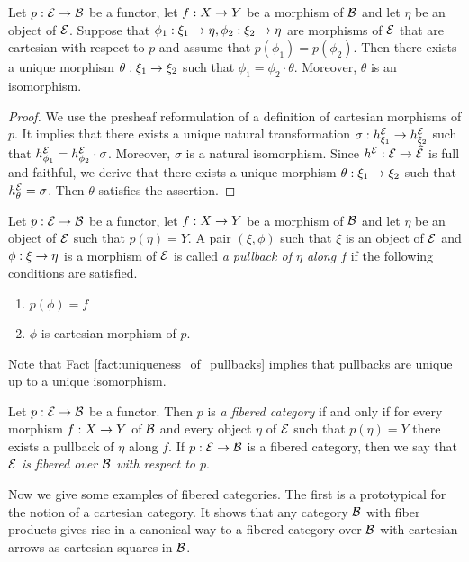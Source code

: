 \begin{fact}\label{fact:uniqueness_of_pullbacks}
Let $p:{\mathcal E}\rightarrow {\mathcal B}$ be a functor, let $f:X\rightarrow Y$ be a morphism of ${\mathcal B}$ and let $\eta$ be an object of ${\mathcal E}$. Suppose that $\phi_1:\xi_1\rightarrow \eta,\phi_2:\xi_2\rightarrow \eta$ are morphisms of ${\mathcal E}$ that are cartesian with respect to $p$ and assume that $p(\phi_1) = p(\phi_2)$. Then there exists a unique morphism $\theta:\xi_1\rightarrow \xi_2$ such that $\phi_1 = \phi_2\cdot \theta$. Moreover, $\theta$ is an isomorphism.
\end{fact}
\begin{proof}
We use the presheaf reformulation of a definition of cartesian morphisms of $p$. It implies that there exists a unique natural transformation $\sigma:h^{{\mathcal E}}_{\xi_1}\rightarrow h^{{\mathcal E}}_{\xi_2}$ such that $h^{{\mathcal E}}_{\phi_1} = h^{{\mathcal E}}_{\phi_2}\cdot \sigma$. Moreover, $\sigma$ is a natural isomorphism. Since $h^{{\mathcal E}}:{\mathcal E}\rightarrow \widehat{{\mathcal E}}$ is full and faithful, we derive that there exists a unique morphism $\theta:\xi_1 \rightarrow \xi_2$ such that $h^{{\mathcal E}}_{\theta} = \sigma$. Then $\theta$ satisfies the assertion.
\end{proof}

\begin{definition}
Let $p:{\mathcal E}\rightarrow {\mathcal B}$ be a functor, let $f:X\rightarrow Y$ be a morphism of ${\mathcal B}$ and let $\eta$ be an object of ${\mathcal E}$ such that $p(\eta) = Y$. A pair $(\xi,\phi)$ such that $\xi$ is an object of ${\mathcal E}$ and $\phi:\xi\rightarrow \eta$ is a morphism of ${\mathcal E}$ is called \textit{a pullback of $\eta$ along $f$} if the following conditions are satisfied.
\begin{enumerate}[label=\textbf{(\arabic*)}, leftmargin=3.0em]
\item $p(\phi) = f$
\item $\phi$ is cartesian morphism of $p$.
\end{enumerate}
\end{definition}
\noindent
Note that Fact \ref{fact:uniqueness_of_pullbacks} implies that pullbacks are unique up to a unique isomorphism.

\begin{definition}
Let $p:{\mathcal E}\rightarrow {\mathcal B}$ be a functor. Then $p$ is \textit{a fibered category} if and only if for every morphism $f:X\rightarrow Y$ of ${\mathcal B}$ and every object $\eta$ of ${\mathcal E}$ such that $p(\eta) = Y$ there exists a pullback of $\eta$ along $f$. If $p:{\mathcal E}\rightarrow {\mathcal B}$ is a fibered category, then we say that \textit{${\mathcal E}$ is fibered over ${\mathcal B}$ with respect to $p$}.
\end{definition}
\noindent
Now we give some examples of fibered categories. The first is a prototypical for the notion of a cartesian category. It shows that any category ${\mathcal B}$ with fiber products gives rise in a canonical way to a fibered category over ${\mathcal B}$ with cartesian arrows as cartesian squares in ${\mathcal B}$.

